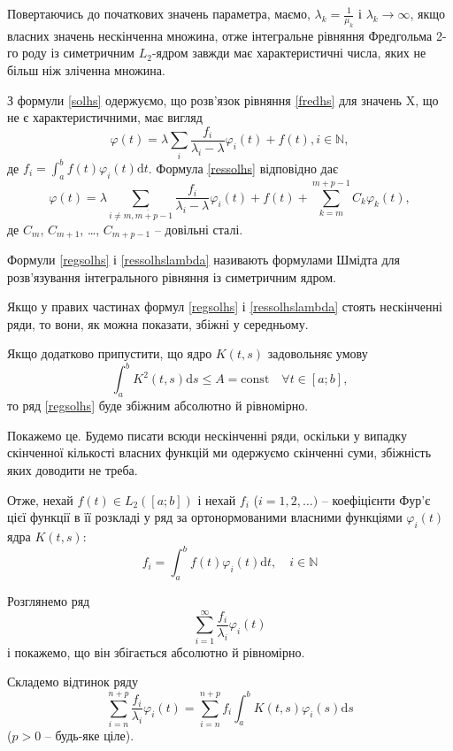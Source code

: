 \documentclass[14pt,twoside]{extreport}
\theoremstyle{mystyle}
\numberwithin{equation}{chapter}
\begin{document}
Повертаючись до початкових значень параметра, маємо, $\lambda_k = \frac{1}{\mu_k}$ і $\lambda_k \to \infty$, якщо власних значень нескінченна множина, отже інтегральне рівняння Фредгольма 2-го роду із симетричним $L_2$-ядром завжди має характеристичні числа, яких не більш ніж зліченна множина.

З формули \eqref{solhs} одержуємо, що розв'язок рівняння \eqref{fredhs} для значень X, що не є характеристичними, має вигляд
\begin{equation}\label{regsolhs}
 \varphi(t) = \lambda \sum_{i} \frac{f_i}{\lambda_i - \lambda} \varphi_i(t) + f(t), i\in \mathbb{N},
\end{equation}
де $f_i = \int_a^b f(t) \varphi_i (t) \mathrm{d}t$. Формула \eqref{ressolhs} відповідно дає
\begin{equation}\label{ressolhslambda}
 \varphi(t) = \lambda \sum_{i\neq \overline{m, m+p-1}} \frac{f_i}{\lambda_i - \lambda} \varphi_i(t) +f(t) + \sum_{k=m}^{m+p-1} C_k \varphi_k (t),
\end{equation}
де $C_m$, $C_{m+1}$, \ldots , $C_{m+p-1}$ -- довільні сталі.

Формули \eqref{regsolhs} і \eqref{ressolhslambda} називають формулами Шмідта для розв'язування інтегрального рівняння із симетричним ядром.

Якщо у правих частинах формул \eqref{regsolhs} і \eqref{ressolhslambda} стоять нескінченні ряди, то вони, як можна показати, збіжні у середньому.

Якщо додатково припустити, що ядро $K(t, s)$ задовольняє умову
\[
 \int_a^b K^2 (t, s) \mathrm{d}s \leqslant A = \textrm{const} \quad \forall t \in [a; b],
\]
то ряд \eqref{regsolhs} буде збіжним абсолютно й рівномірно.

Покажемо це. Будемо писати всюди нескінченні ряди, оскільки у випадку скінченної кількості власних функцій ми одержуємо скінченні суми, збіжність яких доводити не треба.

Отже, нехай $f(t) \in L_2([a; b])$ і нехай $f_i$ ($i = 1, 2, \ldots)$ -- коефіцієнти Фур'є цієї функції в її розкладі у ряд за ортонормованими власними функціями $\varphi_i(t)$ ядра $K(t, s)$:
\[
 f_i = \int_a^b f(t) \varphi_i(t) \mathrm{d} t, \quad i \in \mathbb{N}
\]

Розглянемо ряд
\[
 \sum_{i=1}^{\infty} \frac{f_i}{\lambda_i} \varphi_i(t)
\]
і покажемо, що він збігається абсолютно й рівномірно.

Складемо відтинок ряду
\[
 \sum_{i=n}^{n+p} \frac{f_i}{\lambda_i} \varphi_i(t) = \sum_{i=n}^{n+p} f_i \int_a^b K(t, s) \varphi_i(s) \mathrm{d} s
\]
($p > 0$ -- будь-яке ціле).
\end{document}
